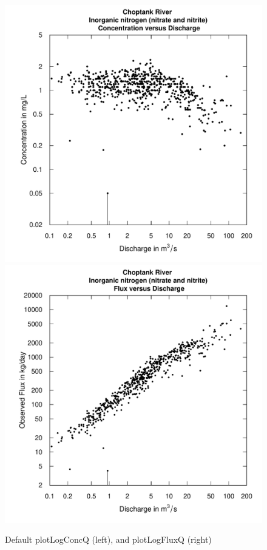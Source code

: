 \documentclass[a4paper,11pt]{article}\usepackage{graphicx, color}
\newenvironment{knitrout}{}{} %
\begin{document}
\begin{knitrout}
\color{fgcolor}\begin{figure}[]

\includegraphics[width=.5\linewidth,height=.5\linewidth]{figure/plotLogConcQ1} 
\includegraphics[width=.5\linewidth,height=.5\linewidth]{figure/plotLogConcQ2} \caption[Default plotLogConcQ (left), and plotLogFluxQ (right)]{Default plotLogConcQ (left), and plotLogFluxQ (right)\label{fig:plotLogConcQ}}
\end{figure}


\end{knitrout}
\end{document}
